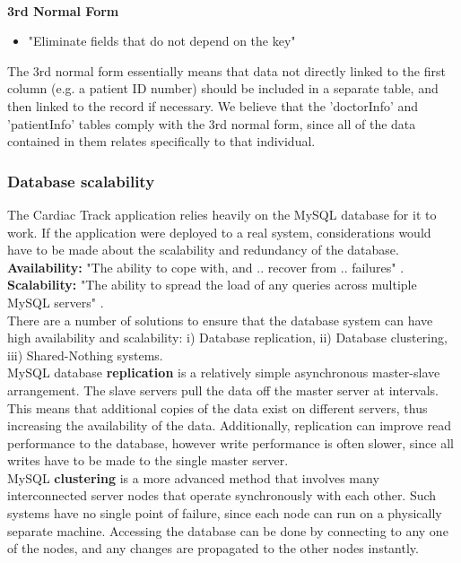 \documentclass[11pt]{article}
\begin{document}
\\
\textbf{3rd Normal Form}
\begin{itemize}
\item{"Eliminate fields that do not depend on the key" \cite{microsoft:dbnorm}}
\end{itemize}
The 3rd normal form essentially means that data not directly linked to the first column (e.g. a patient ID number) should be included in a separate table, and then linked to the record if necessary. We believe that the 'doctorInfo' and 'patientInfo' tables comply with the 3rd normal form, since all of the data contained in them relates specifically to that individual.   

\subsubsection{Database scalability}
The Cardiac Track application relies heavily on the MySQL database for it to work. If the application were deployed to a real system, considerations would have to be made about the scalability and redundancy of the database. 
\\
\textbf{Availability:} "The ability to cope with, and .. recover from .. failures" \cite{mysql:chapter15}.
\\
\textbf{Scalability:} "The ability to spread the load of any queries across multiple MySQL servers" \cite{mysql:chapter15}.
\\
There are a number of solutions to ensure that the database system can have high availability and scalability: i) Database replication, ii) Database clustering, iii) Shared-Nothing systems.
\\ \indent
MySQL database \textbf{replication} \cite{mysql:chapter16} is a relatively simple asynchronous master-slave arrangement. The slave servers pull the data off the master server at intervals. This means that additional copies of the data exist on different servers, thus increasing the availability of the data. Additionally, replication can improve read performance to the database, however write performance is often slower, since all writes have to be made to the single master server.
\\ \indent
MySQL \textbf{clustering} \cite{mysql:chapter17} is a more advanced method that involves many interconnected server nodes that operate synchronously with each other. Such systems have no single point of failure, since each node can run on a physically separate machine. Accessing the database can be done by connecting to any one of the nodes, and any changes are propagated to the other nodes instantly. 
\end{document}
